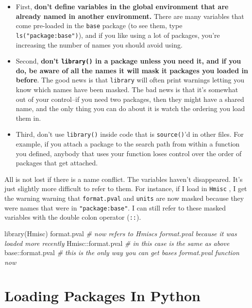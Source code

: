 \documentclass[
  12pt,
  krantz2]{krantz}
\makeatletter
\newenvironment{Shaded}{\begin{snugshade}}{\end{snugshade}}
\newcommand{\CommentTok}[1]{\textcolor[rgb]{0.37,0.37,0.37}{\textit{#1}}}
\newcommand{\FunctionTok}[1]{\textcolor[rgb]{0,0,0}{#1}}
\newcommand{\NormalTok}[1]{#1}
\newcommand{\SpecialCharTok}[1]{\textcolor[rgb]{0,0,0}{#1}}
\newenvironment{kframe}{%
\medskip{}
\setlength{\fboxsep}{.8em}
 \def\at@end@of@kframe{}%
 \ifinner\ifhmode%
  \def\at@end@of@kframe{\end{minipage}}%
  \begin{minipage}{\columnwidth}%
 \fi\fi%
 \def\FrameCommand##1{\hskip\@totalleftmargin \hskip-\fboxsep
 \colorbox{shadecolor}{##1}\hskip-\fboxsep
     \hskip-\linewidth \hskip-\@totalleftmargin \hskip\columnwidth}%
 \MakeFramed {\advance\hsize-\width
   \@totalleftmargin\z@ \linewidth\hsize
   \@setminipage}}%
 {\par\unskip\endMakeFramed%
 \at@end@of@kframe}
\renewenvironment{Shaded}{\begin{kframe}}{\end{kframe}}
\makeatother
\begin{document}
\begin{itemize}
\item
  First, \textbf{don't define variables in the global environment that are already named in another environment.} There are many variables that come pre-loaded in the \texttt{base} package (to see them, type \texttt{ls("package:base")}), and if you like using a lot of packages, you're increasing the number of names you should avoid using.
\item
  Second, \textbf{don't \texttt{library()} in a package unless you need it, and if you do, be aware of all the names it will mask it packages you loaded in before}. The good news is that \texttt{library} will often print warnings letting you know which names have been masked. The bad news is that it's somewhat out of your control--if you need two packages, then they might have a shared name, and the only thing you can do about it is watch the ordering you load them in.
\item
  Third, don't use \texttt{library()} inside code that is \texttt{source()}'d in other files. For example, if you attach a package to the search path from within a function you defined, anybody that uses your function loses control over the order of packages that get attached.
\end{itemize}

All is not lost if there is a name conflict. The variables haven't disappeared. It's just slightly more difficult to refer to them. For instance, if I load in \texttt{Hmisc} \citep{hmisc}, I get the warning warning that \texttt{format.pval} and \texttt{units} are now masked because they were names that were in \texttt{"package:base"}. I can still refer to these masked variables with the double colon operator (\texttt{::}).

\begin{Shaded}
\begin{Highlighting}[]
\FunctionTok{library}\NormalTok{(Hmisc)}
\NormalTok{format.pval }\CommentTok{\# now refers to Hmisc\textquotesingle{}s format.pval because it was loaded more recently}
\NormalTok{Hmisc}\SpecialCharTok{::}\NormalTok{format.pval }\CommentTok{\# in this case is the same as above}
\NormalTok{base}\SpecialCharTok{::}\NormalTok{format.pval  }\CommentTok{\# this is the only way you can get base\textquotesingle{}s format.pval function now }
\end{Highlighting}
\end{Shaded}

\hypertarget{loading-packages-in-python}{%
\section{Loading Packages In Python}\label{loading-packages-in-python}}
\end{document}
